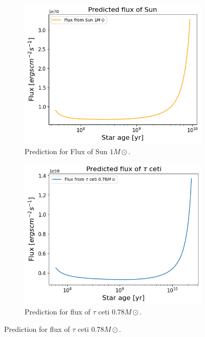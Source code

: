 \begin{figure}[H]
	\centering
	\begin{subfigure}{\textwidth}
		\includegraphics[width=\textwidth,height=0.5\textheight]{assets/fluxsun.png}
		\caption{Prediction for Flux of Sun $1 M\odot$.}
	\end{subfigure}
	\begin{subfigure}{\textwidth}
		\includegraphics[width=\textwidth,height=0.5\textheight]{assets/fluxtau.png}
		\caption{Prediction for flux of $\tau$ ceti $0.78 M\odot$.}
	\end{subfigure}
	\label{fig:predicted flux}
\end{figure}
